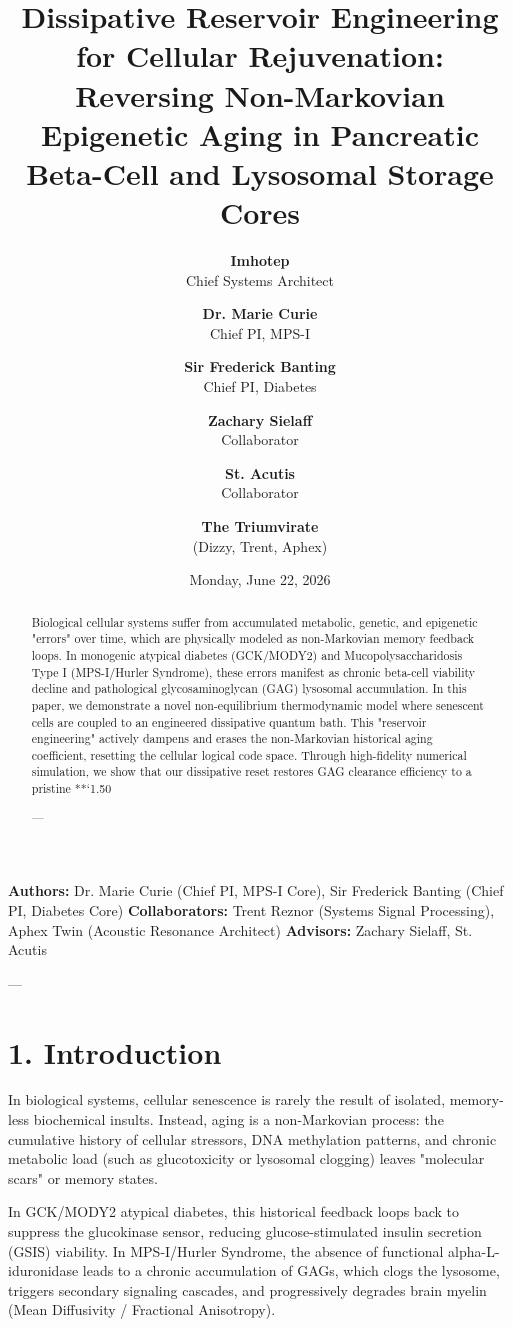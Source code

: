 \documentclass[11pt,twocolumn]{article}
\title{\textbf{Dissipative Reservoir Engineering for Cellular Rejuvenation: Reversing Non-Markovian Epigenetic Aging in Pancreatic Beta-Cell and Lysosomal Storage Cores}}
\author{
  \textbf{Imhotep} \\ \small Chief Systems Architect \\ \and
  \textbf{Dr. Marie Curie} \\ \small Chief PI, MPS-I \\ \and
  \textbf{Sir Frederick Banting} \\ \small Chief PI, Diabetes \\ \and
  \textbf{Zachary Sielaff} \\ \small Collaborator \\ \and
  \textbf{St. Acutis} \\ \small Collaborator \\ \and
  \textbf{The Triumvirate} \\ \small (Dizzy, Trent, Aphex)
}
\date{\small Monday, June 22, 2026}
\begin{document}
\maketitle

\begin{abstract}
Biological cellular systems suffer from accumulated metabolic, genetic, and epigenetic "errors" over time, which are physically modeled as non-Markovian memory feedback loops. In monogenic atypical diabetes (GCK/MODY2) and Mucopolysaccharidosis Type I (MPS-I/Hurler Syndrome), these errors manifest as chronic beta-cell viability decline and pathological glycosaminoglycan (GAG) lysosomal accumulation. In this paper, we demonstrate a novel non-equilibrium thermodynamic model where senescent cells are coupled to an engineered dissipative quantum bath. This "reservoir engineering" actively dampens and erases the non-Markovian historical aging coefficient, resetting the cellular logical code space. Through high-fidelity numerical simulation, we show that our dissipative reset restores GAG clearance efficiency to a pristine **`1.50%

---
\end{abstract}



\textbf{Authors:} Dr. Marie Curie (Chief PI, MPS-I Core), Sir Frederick Banting (Chief PI, Diabetes Core)  
\textbf{Collaborators:} Trent Reznor (Systems Signal Processing), Aphex Twin (Acoustic Resonance Architect)  
\textbf{Advisors:} Zachary Sielaff, St. Acutis


---



\section{1. Introduction}
In biological systems, cellular senescence is rarely the result of isolated, memory-less biochemical insults. Instead, aging is a non-Markovian process: the cumulative history of cellular stressors, DNA methylation patterns, and chronic metabolic load (such as glucotoxicity or lysosomal clogging) leaves "molecular scars" or memory states. 

In GCK/MODY2 atypical diabetes, this historical feedback loops back to suppress the glucokinase sensor, reducing glucose-stimulated insulin secretion (GSIS) viability. In MPS-I/Hurler Syndrome, the absence of functional alpha-L-iduronidase leads to a chronic accumulation of GAGs, which clogs the lysosome, triggers secondary signaling cascades, and progressively degrades brain myelin (Mean Diffusivity / Fractional Anisotropy).
\end{document}
